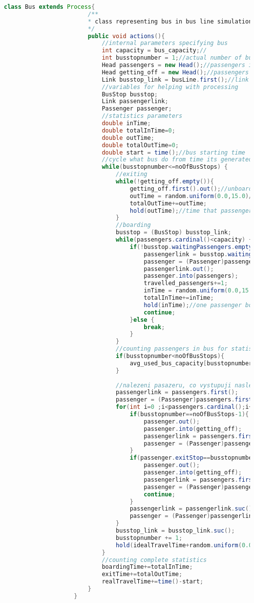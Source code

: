 \documentclass{article}
\begin{document}
\begin{lstlisting}[language=java]
					class Bus extends Process{
						/**
						* class representing bus in bus line simulation
						*/
						public void actions(){
							//internal parameters specifying bus
							int capacity = bus_capacity;//
							int busstopnumber = 1;//actual number of busstop
							Head passengers = new Head();//passengers in bus capacity
							Head getting_off = new Head();//passengers exiting next stop (waiting near doors)
							Link busstop_link = busLine.first();//link onto first bus stop
							//variables for helping with processing
							BusStop busstop;
							Link passengerlink;
							Passenger passenger;
							//statistics parameters
							double inTime;
							double totalInTime=0;
							double outTime;
							double totalOutTime=0;
							double start = time();//bus starting time
							//cycle what bus do from time its generated till final stop
							while(busstopnumber<=noOfBusStops) {
								//exiting
								while(!getting_off.empty()){
									getting_off.first().out();//unboarding / exiting
									outTime = random.uniform(0.0,15.0)/60;//generating random exit time
									totalOutTime+=outTime;
									hold(outTime);//time that passenger needs to exit bus
								}
								//boarding
								busstop = (BusStop) busstop_link;
								while(passengers.cardinal()<capacity) {
									if(!busstop.waitingPassengers.empty()){
										passengerlink = busstop.waitingPassengers.first();
										passenger = (Passenger)passengerlink;
										passengerlink.out();
										passenger.into(passengers);
										travelled_passengers+=1;
										inTime = random.uniform(0.0,15.0)/60;//generating random exit time
										totalInTime+=inTime;
										hold(inTime);//one passenger boarding time
										continue;
									}else {
										break;
									}
								}
								//counting passengers in bus for statistics
								if(busstopnumber<noOfBusStops){
									avg_used_bus_capacity[busstopnumber-1] += passengers.cardinal();
								}
								
								//nalezeni pasazeru, co vystupuji nasledujici zastavku
								passengerlink = passengers.first();
								passenger = (Passenger)passengers.first();
								for(int i=0 ;i<passengers.cardinal();i++){
									if(busstopnumber==noOfBusStops-1){
										passenger.out();
										passenger.into(getting_off);
										passengerlink = passengers.first();
										passenger = (Passenger)passengerlink;
									}
									if(passenger.exitStop==busstopnumber+1){
										passenger.out();
										passenger.into(getting_off);
										passengerlink = passengers.first();
										passenger = (Passenger)passengerlink;
										continue;
									}
									passengerlink = passengerlink.suc();
									passenger = (Passenger)passengerlink;
								}
								busstop_link = busstop_link.suc();
								busstopnumber += 1;
								hold(idealTravelTime+random.uniform(0.0,2.0));//travel time plus delay
							}
							//counting complete statistics
							boardingTime+=totalInTime;
							exitTime+=totalOutTime;
							realTravelTime+=time()-start;
						}
					}
					

\end{lstlisting}
\end{document}
